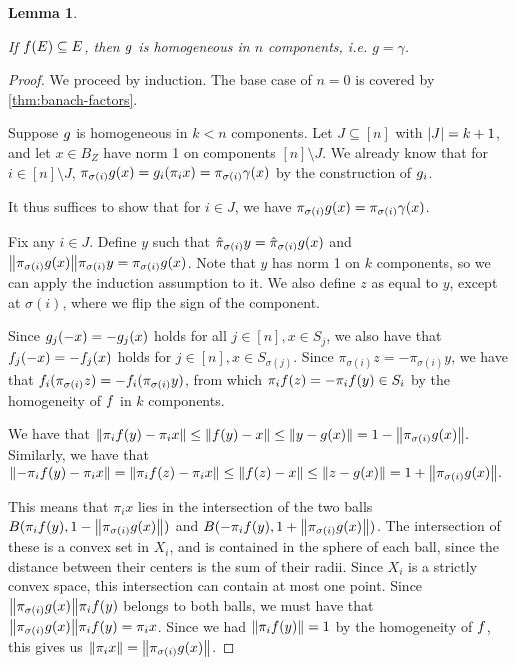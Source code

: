 \documentclass{amsart}
\newtheorem{lemma}{Lemma}
\theoremstyle{definition}
\begin{document}
\begin{lemma} \label{lem:g-homogeneous}

  \annotation
  If $f(E) \subseteq E$, then $g$ is homogeneous in $n$ components, i.e. $g = \gamma$.
\end{lemma}
\begin{proof} 

  We proceed by induction. The base case of $n=0$ is covered by \autoref{thm:banach-factors}.

  Suppose $g$ is homogeneous in $k < n$ components. Let $J \subseteq [n]$ with
  $\abs{J} = k+1$, and let $x \in B_Z$ have norm 1 on components $[n] \setminus J$. We
  already know that for $i \in [n]\setminus J$, $\pi_{\sigma(i)} g(x) = g_i (\pi_i x)
  = \pi_{\sigma(i)} \gamma (x)$ by
  the construction of $g_i$.

  It thus suffices to show that for $i \in J$, we have $\pi_{\sigma(i)} g(x) =
  \pi_{\sigma(i)} \gamma(x)$.

	Fix any $i \in J$. Define $y$ such that $\hat{\pi}_{\sigma(i)} y = \hat{\pi}_{\sigma(i)} g(x)$ and $\norm{\pi_{\sigma(i)} g(x)} \pi_{\sigma(i)} y = \pi_{\sigma(i)} g(x)$. Note that
	$y$ has norm 1 on $k$ components, so we can apply the induction assumption to it.
	We also define $z$ as equal to $y$, except at $\sigma(i)$, where we flip the
	sign of the component.



	Since $g_j (-x) = -g_j (x)$ holds for all $j \in [n], x \in S_j$, we also have that
	$f_j (-x) = -f_j (x)$ holds for
	$j \in [n], x \in S_{\sigma(j)}$. Since $\pi_{\sigma(i)} z = -\pi_{\sigma(i)} y$, we have that
  $f_i (\pi_{\sigma(i)} z) = -f_i (\pi_{\sigma(i)} y)$, from which
  $\pi_i f(z) = -\pi_i f(y) \in S_i$ by the homogeneity of $f$ in $k$ components.

  We have that
  $ \norm{\pi_i f(y) - \pi_i x} \leq \norm{f(y) - x} \leq \norm{y - g(x)} = 1 - \norm{\pi_{\sigma(i)} g(x)}. $
	Similarly, we have that
  $ \norm{-\pi_i f(y) - \pi_i x} = \norm{\pi_i f(z) - \pi_i x} \leq \norm{f(z) - x} \leq \norm{z - g(x)} = 1 + \norm{\pi_{\sigma(i)} g(x)}. $


  This means that $\pi_i x$ lies in the
	intersection of the two balls $B(\pi_i f(y), 1-\norm{\pi_{\sigma(i)} g(x)})$ and
	$B(-\pi_i f(y), 1+\norm{\pi_{\sigma(i)} g(x)})$. The intersection of these is a convex
	set in $X_i$, and is contained in the sphere of each ball, since the distance between their centers is the sum of their radii. Since $X_i$ is a strictly
	convex space, this intersection can contain at most one point. Since
  $\norm{\pi_{\sigma(i)} g(x)}\pi_i f(y)$ belongs to both balls, we must have that
	$\norm{\pi_{\sigma(i)} g(x)}\pi_i f(y) = \pi_i x$. Since we had $\norm{\pi_i f(y)}=1$
	by the homogeneity of $f$, this gives us
  $\norm{\pi_i x} = \norm{\pi_{\sigma(i)} g(x)}$.


\end{proof}
\end{document}
